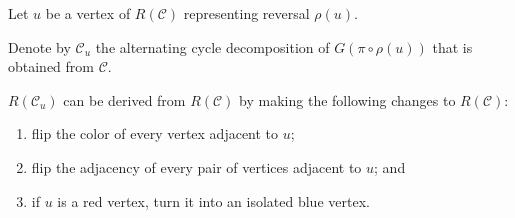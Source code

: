 \documentclass[handout]{beamer}
\theoremstyle{definition}
\begin{document}
\begin{frame}

Let $u$ be a vertex of $R(\mathcal{C})$ representing reversal $\rho(u)$.\pause

\begin{definition}
Denote by $\mathcal{C}_u$ the alternating cycle decomposition of $G(\pi \circ \rho(u))$ that is obtained from $\mathcal{C}$.%
\end{definition}\pause

\begin{lemma}
\label{lem:5}
$R(\mathcal{C}_u)$ can be derived from $R(\mathcal{C})$ by making the following changes to $R(\mathcal{C})$:\pause
\begin{enumerate}
    \item flip the color of every vertex adjacent to $u$\pause;
    \item flip the adjacency of every pair of vertices adjacent to $u$\pause; and
    \item if $u$ is a red vertex, turn it into an isolated blue vertex.
\end{enumerate}
\end{lemma}

\end{frame}
\end{document}
